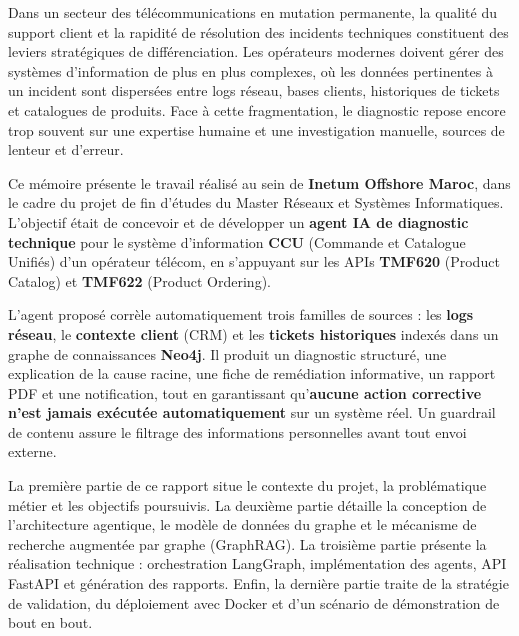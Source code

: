 \introduction
Dans un secteur des télécommunications en mutation permanente, la qualité du support client et la rapidité de résolution des incidents techniques constituent des leviers stratégiques de différenciation. Les opérateurs modernes doivent gérer des systèmes d'information de plus en plus complexes, où les données pertinentes à un incident sont dispersées entre logs réseau, bases clients, historiques de tickets et catalogues de produits. Face à cette fragmentation, le diagnostic repose encore trop souvent sur une expertise humaine et une investigation manuelle, sources de lenteur et d'erreur.

\medskip

Ce mémoire présente le travail réalisé au sein de \textbf{Inetum Offshore Maroc}, dans le cadre du projet de fin d'études du Master Réseaux et Systèmes Informatiques. L'objectif était de concevoir et de développer un \textbf{agent IA de diagnostic technique} pour le système d'information \textbf{CCU} (Commande et Catalogue Unifiés) d'un opérateur télécom, en s'appuyant sur les APIs \textbf{TMF620} (Product Catalog) et \textbf{TMF622} (Product Ordering).

\medskip

L'agent proposé corrèle automatiquement trois familles de sources : les \textbf{logs réseau}, le \textbf{contexte client} (CRM) et les \textbf{tickets historiques} indexés dans un graphe de connaissances \textbf{Neo4j}. Il produit un diagnostic structuré, une explication de la cause racine, une fiche de remédiation informative, un rapport PDF et une notification, tout en garantissant qu'\textbf{aucune action corrective n'est jamais exécutée automatiquement} sur un système réel. Un guardrail de contenu assure le filtrage des informations personnelles avant tout envoi externe.

\medskip

La première partie de ce rapport situe le contexte du projet, la problématique métier et les objectifs poursuivis. La deuxième partie détaille la conception de l'architecture agentique, le modèle de données du graphe et le mécanisme de recherche augmentée par graphe (GraphRAG). La troisième partie présente la réalisation technique : orchestration LangGraph, implémentation des agents, API FastAPI et génération des rapports. Enfin, la dernière partie traite de la stratégie de validation, du déploiement avec Docker et d'un scénario de démonstration de bout en bout.

